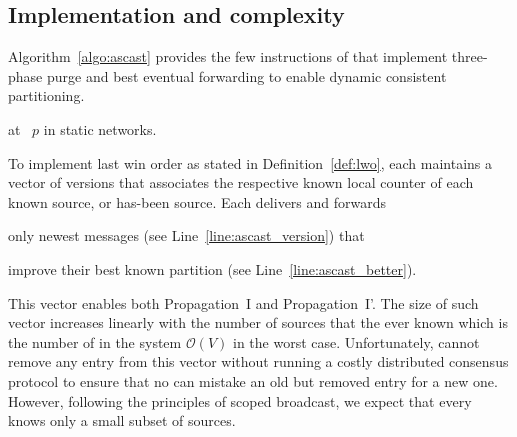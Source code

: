 

\vfill


\newpage

\subsection{Implementation and complexity}

Algorithm~\ref{algo:ascast} provides the few instructions of \NAME
that implement three-phase purge and best eventual forwarding to
enable dynamic consistent partitioning.



\begin{algorithm}
  
  \caption{\label{algo:ascast}\NAME at \Process~$p$ in static networks.}
\end{algorithm}

To implement last win order as stated in Definition~\ref{def:lwo},
each \process maintains a vector of versions that associates the
respective known local counter of each known source, or has-been
source.  Each \process delivers and forwards
\begin{inparaenum}[(i)]
\item only newest messages (see Line~\ref{line:ascast_version}) that
\item improve their best known partition (see
  Line~\ref{line:ascast_better}).
\end{inparaenum}
This vector enables both Propagation~I and Propagation~I'.  The size
of such vector increases linearly with the number of sources that the
\process ever known which is the number of \processes in the system
$\mathcal{O}(V)$ in the worst case. Unfortunately, \processes cannot
remove any entry from this vector without running a costly distributed
consensus protocol to ensure that no \process can mistake an old but
removed entry for a new one. However, following the principles of
scoped broadcast, we expect that every \process knows only a small
subset of sources.


